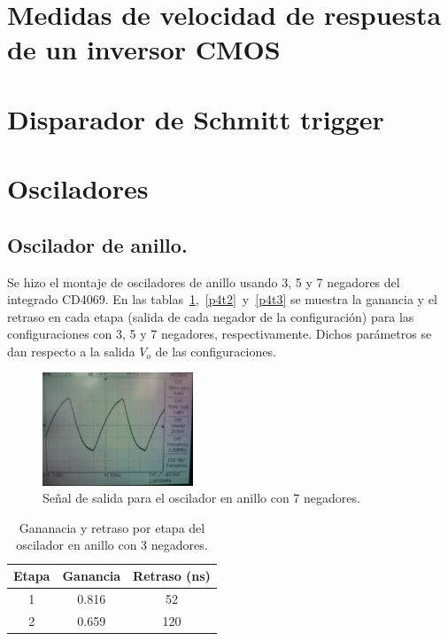 \documentclass[twocolumn]{IEEEtran}
\begin{document}
\section{Medidas de velocidad de respuesta de un inversor CMOS}


\section{Disparador de Schmitt trigger}


\section{Osciladores}

\subsection{Oscilador de anillo.}
Se hizo el montaje de osciladores de anillo usando 3, 5 y 7 negadores del integrado CD4069.
En las tablas~\ref{p4t1},~\ref{p4t2}~y~\ref{p4t3} se muestra la ganancia y el retraso en cada etapa (salida de cada negador de la configuración) para las configuraciones con 3, 5 y 7 negadores, respectivamente. Dichos parámetros se dan respecto a la salida $V_o$ de las configuraciones.

\begin{figure}[H]%
\centering
	\includegraphics[width=0.40\textwidth]{WP_000051.jpg}
	\caption{Señal de salida para el oscilador en anillo con 7 negadores.}
	
	\label{anillo1}

\end{figure}

\begin{table}[h]
	\renewcommand{\arraystretch}{1.1}
	\caption{Gananacia y retraso  por etapa del oscilador en anillo con 3 negadores.}
	\label{p4t1}
	\centering
	\begin{tabular}{|c|c|c|}
	\hline
	\bf Etapa & \bf Ganancia & \bf Retraso (ns) \\
	\hline
	1 & 0.816 & 52 \\
	\hline
	2 & 0.659 & 120 \\
	\hline
	\end{tabular}
\end{table}
\end{document}
